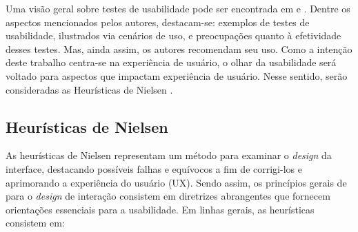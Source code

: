 Uma visão geral sobre testes de usabilidade pode ser encontrada em  e . Dentre os aspectos mencionados pelos autores, destacam-se: exemplos de testes de usabilidade, ilustrados via cenários de uso, e preocupações quanto à efetividade desses testes. Mas, ainda assim, os autores recomendam seu uso. Como a intenção deste trabalho centra-se na experiência de usuário, o olhar da usabilidade será voltado para aspectos que impactam experiência de usuário. Nesse sentido, serão consideradas as Heurísticas de Nielsen \cite{HeuristicasNielsen}.



\subsection{Heurísticas de Nielsen}
    \label{HeuristicasNielsen}

As heurísticas de Nielsen representam um método para examinar o \textit{design} da interface, destacando possíveis falhas e equívocos a fim de corrigi-los e aprimorando a experiência do usuário (UX). Sendo assim, os princípios gerais de  para o \textit{design} de interação consistem em diretrizes abrangentes que fornecem orientações essenciais para a usabilidade. Em linhas gerais, as heurísticas consistem em:

